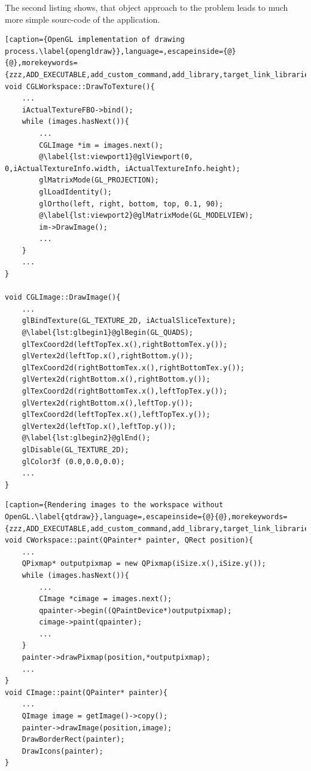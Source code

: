 The second listing shows, that object approach to the problem leads to much more simple sourc-code of the application.
\begin{lstlisting}[caption={OpenGL implementation of drawing process.\label{opengldraw}},language=,escapeinside={@}{@},morekeywords={zzz,ADD_EXECUTABLE,add_custom_command,add_library,target_link_libraries,OUTPUT,COMMAND,xxx}]
void CGLWorkspace::DrawToTexture(){
	...
	iActualTextureFBO->bind();
	while (images.hasNext()){
		...
		CGLImage *im = images.next();
		@\label{lst:viewport1}@glViewport(0, 0,iActualTextureInfo.width, iActualTextureInfo.height);
		glMatrixMode(GL_PROJECTION);
		glLoadIdentity();
		glOrtho(left, right, bottom, top, 0.1, 90);
		@\label{lst:viewport2}@glMatrixMode(GL_MODELVIEW); 
		im->DrawImage();
		...
	}
	...
}

void CGLImage::DrawImage(){
	...
	glBindTexture(GL_TEXTURE_2D, iActualSliceTexture);
	@\label{lst:glbegin1}@glBegin(GL_QUADS);
	glTexCoord2d(leftTopTex.x(),rightBottomTex.y()); 
	glVertex2d(leftTop.x(),rightBottom.y());
	glTexCoord2d(rightBottomTex.x(),rightBottomTex.y());
	glVertex2d(rightBottom.x(),rightBottom.y());
	glTexCoord2d(rightBottomTex.x(),leftTopTex.y());
	glVertex2d(rightBottom.x(),leftTop.y());
	glTexCoord2d(leftTopTex.x(),leftTopTex.y());
	glVertex2d(leftTop.x(),leftTop.y());
	@\label{lst:glbegin2}@glEnd();
	glDisable(GL_TEXTURE_2D);
	glColor3f (0.0,0.0,0.0);
	...
}
\end{lstlisting}
\begin{lstlisting}[caption={Rendering images to the workspace without OpenGL.\label{qtdraw}},language=,escapeinside={@}{@},morekeywords={zzz,ADD_EXECUTABLE,add_custom_command,add_library,target_link_libraries,OUTPUT,COMMAND,xxx}]
void CWorkspace::paint(QPainter* painter, QRect position){
	...
	QPixmap* outputpixmap = new QPixmap(iSize.x(),iSize.y());
	while (images.hasNext()){
		...
		CImage *cimage = images.next();
		qpainter->begin((QPaintDevice*)outputpixmap);
		cimage->paint(qpainter);
		...
	}
	painter->drawPixmap(position,*outputpixmap);
	...
}
void CImage::paint(QPainter* painter){
	...
	QImage image = getImage()->copy();
	painter->drawImage(position,image);
	DrawBorderRect(painter);
	DrawIcons(painter);
}
\end{lstlisting}
